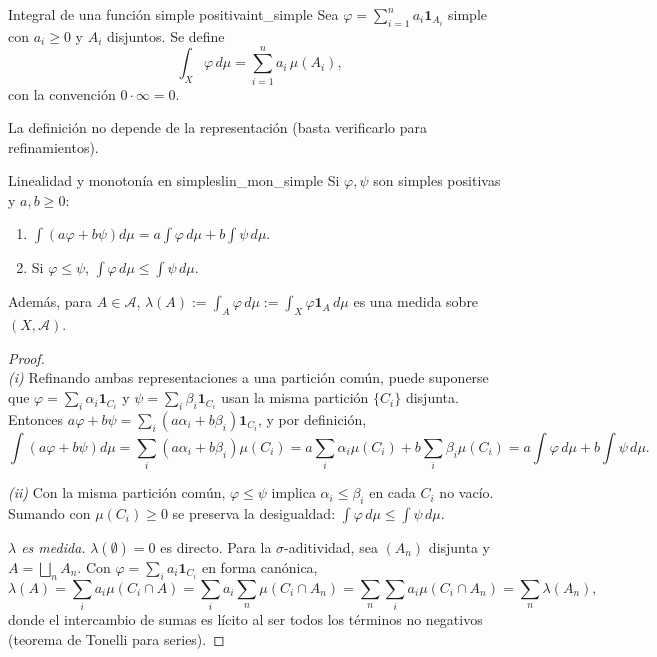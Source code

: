 \documentclass[11pt, a4paper]{article}
\begin{document}
\begin{definicion}{Integral de una función simple positiva}{int_simple}
Sea $\varphi = \sum_{i=1}^n a_i \mathbf{1}_{A_i}$ simple con $a_i \ge 0$ y $A_i$ disjuntos.
Se define
$$ \int_X \varphi \, d\mu = \sum_{i=1}^n a_i \, \mu(A_i), $$
con la convención $0 \cdot \infty = 0$.
\end{definicion}

\obs La definición no depende de la representación (basta verificarlo para refinamientos).

\begin{proposicion}{Linealidad y monotonía en simples}{lin_mon_simple}
Si $\varphi, \psi$ son simples positivas y $a, b \ge 0$:
\begin{enumerate}
    \item $\int (a \varphi + b \psi) d\mu = a \int \varphi \, d\mu + b \int \psi \, d\mu$.
    \item Si $\varphi \le \psi$, $\int \varphi \, d\mu \le \int \psi \, d\mu$.
\end{enumerate}
Además, para $A \in \mathcal{A}$, $\lambda(A) := \int_A \varphi \, d\mu := \int_X \varphi
\mathbf{1}_A \, d\mu$ es una medida sobre $(X, \mathcal{A})$.
\end{proposicion}

\begin{proof}\leavevmode\\
\textit{(i)} Refinando ambas representaciones a una partición común, puede suponerse que
$\varphi = \sum_i \alpha_i \mathbf{1}_{C_i}$ y $\psi = \sum_i \beta_i \mathbf{1}_{C_i}$ usan la
misma partición $\{C_i\}$ disjunta. Entonces $a \varphi + b \psi = \sum_i (a \alpha_i + b
\beta_i) \mathbf{1}_{C_i}$, y por definición,
$$ \int (a \varphi + b \psi) d\mu = \sum_i (a \alpha_i + b \beta_i) \mu(C_i) = a \sum_i \alpha_i
\mu(C_i) + b \sum_i \beta_i \mu(C_i) = a \int \varphi \, d\mu + b \int \psi \, d\mu. $$

\textit{(ii)} Con la misma partición común, $\varphi \le \psi$ implica $\alpha_i \le \beta_i$
en cada $C_i$ no vacío. Sumando con $\mu(C_i) \ge 0$ se preserva la desigualdad:
$\int \varphi \, d\mu \le \int \psi \, d\mu$.

\textit{$\lambda$ es medida.} $\lambda(\emptyset) = 0$ es directo. Para la $\sigma$-aditividad,
sea $(A_n)$ disjunta y $A = \bigsqcup_n A_n$. Con $\varphi = \sum_i a_i \mathbf{1}_{C_i}$
en forma canónica,
$$ \lambda(A) = \sum_i a_i \mu(C_i \cap A) = \sum_i a_i \sum_n \mu(C_i \cap A_n) =
\sum_n \sum_i a_i \mu(C_i \cap A_n) = \sum_n \lambda(A_n), $$
donde el intercambio de sumas es lícito al ser todos los términos no negativos (teorema de
Tonelli para series).
\end{proof}
\end{document}

